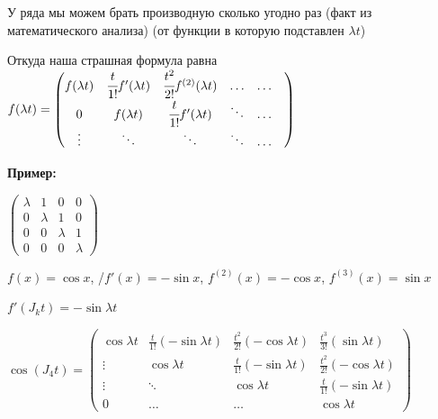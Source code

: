 У ряда мы можем брать производную сколько угодно раз (факт из математического анализа) (от функции в которую подставлен $\lambda t$)

Откуда наша страшная формула равна $f(\lambda t) = \begin{pmatrix}
    f(\lambda t) & \cfrac{t}{1!}f'(\lambda t) & \cfrac{t^2}{2!}f^{(2)}(\lambda t) & \ldots & \ldots & \\
    0 & f(\lambda t) & \cfrac{t}{1!}f'(\lambda t) &\ddots &\ldots 
    \\
    \vdots & \ddots & \ddots & \ddots& \ldots
\end{pmatrix}$


\textbf{Пример:}

$\begin{pmatrix}
    \lambda & 1 & 0 & 0 \\
    0 & \lambda & 1 & 0\\
    0 & 0 & \lambda & 1\\
    0 & 0 & 0 & \lambda
\end{pmatrix}$

$f(x)=\cos x$, /$f'{(x)} = - \sin x$, $f^{(2)}{(x)} = - \cos x$, $f^{(3)}{(x)} =  \sin x$

$f'(J_k t)=- \sin \lambda t$

$\cos (J_4t) = \begin{pmatrix}
    \cos \lambda t & \frac{t}{1!}(-\sin \lambda t) &\frac{t^2}{2!}(-\cos \lambda t) & \frac{t^3}{3!}(\sin \lambda t)\\
    \vdots & \cos \lambda t & \frac{t}{1!}(-\sin \lambda t) &\frac{t^2}{2!}(-\cos \lambda t) \\
    \vdots & \ddots & \cos \lambda t & \frac{t}{1!}(-\sin \lambda t) \\
    0 & \ldots & \ldots & \cos \lambda t
\end{pmatrix}$






